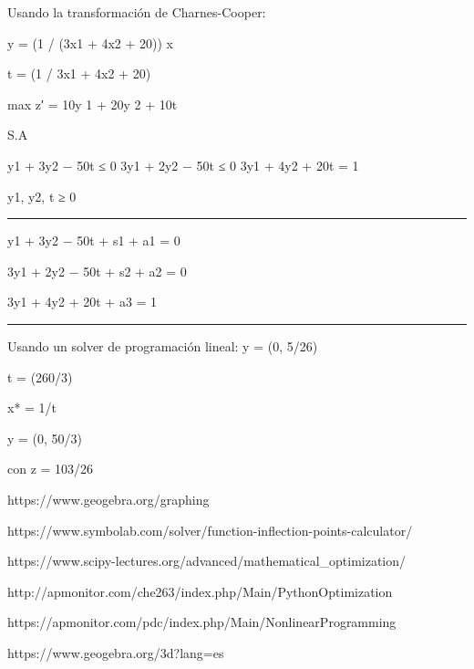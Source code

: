 \documentclass[11pt]{article}
\begin{document}
Usando la transformación de Charnes-Cooper:

y = (1 / (3x1 + 4x2 + 20)) x

t = (1 / 3x1 + 4x2 + 20)

max z′ = 10y 1 + 20y 2 + 10t

S.A

y1 + 3y2 − 50t ≤ 0 3y1 + 2y2 − 50t ≤ 0 3y1 + 4y2 + 20t = 1

y1, y2, t ≥ 0

\begin{center}\rule{0.5\linewidth}{\linethickness}\end{center}

y1 + 3y2 − 50t + s1 + a1 = 0

3y1 + 2y2 − 50t + s2 + a2 = 0

3y1 + 4y2 + 20t + a3 = 1

\begin{center}\rule{0.5\linewidth}{\linethickness}\end{center}

Usando un solver de programación lineal: y = (0, 5/26)

t = (260/3)

x* = 1/t

y = (0, 50/3)

con z = 103/26

    https://www.geogebra.org/graphing

https://www.symbolab.com/solver/function-inflection-points-calculator/

https://www.scipy-lectures.org/advanced/mathematical\_optimization/

http://apmonitor.com/che263/index.php/Main/PythonOptimization

https://apmonitor.com/pdc/index.php/Main/NonlinearProgramming

https://www.geogebra.org/3d?lang=es


    
    
    
    
\end{document}
